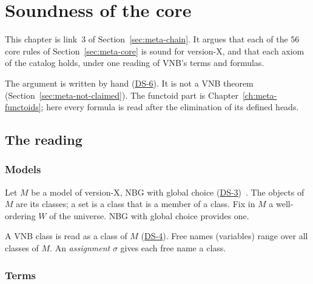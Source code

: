\providecommand{\DS}[1]{\hyperref[ds:#1]{DS-#1}}
\providecommand{\Sq}{\Rightarrow}
\providecommand{\FV}{\mathrm{FV}}

\chapter{Soundness of the core}
\label{ch:meta-soundness}

This chapter is link~3 of Section~\ref{sec:meta-chain}.  It argues
that each of the 56 core rules of Section~\ref{sec:meta-core} is sound
for version-X, and that each axiom of the catalog holds, under one
reading of VNB's terms and formulas.

The argument is written by hand (\DS{6}).  It is not a VNB theorem
(Section~\ref{sec:meta-not-claimed}).  The functoid part is
Chapter~\ref{ch:meta-functoids}; here every formula is read after the
elimination of its defined heads.

\section{The reading}\label{sec:meta-reading}

\subsection{Models}

Let $M$ be a model of version-X, NBG with global choice
(\DS{3})~\cite{vonNeumann1925,Bernays1937,Godel1940}.  The objects of
$M$ are its classes; a set is a class that is a member of a class.  Fix
in $M$ a well-ordering $W$ of the universe.  NBG with global choice
provides one.

A VNB class is read as a class of $M$ (\DS{4}).  Free names
(variables) range over all classes of $M$.  An \emph{assignment}
$\sigma$ gives each free name a class.

\subsection{Terms}

